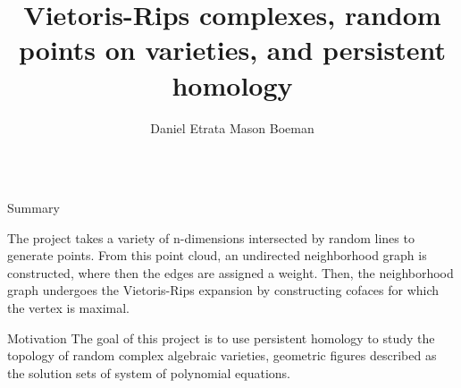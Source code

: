 \documentclass{beamer}
\title{Vietoris-Rips complexes, random points on varieties, and persistent homology}
\author{Daniel Etrata \quad Mason Boeman}
\institute{Mentors: Benjamin Antieau and J\={a}nis Lazovskis}
\begin{document}
\begin{frame}{}
\begin{columns}[t]

\begin{column}{0.32\linewidth}

\begin{block}{Summary}

The project takes a variety of n-dimensions intersected by random lines to generate points. From this point cloud, an undirected neighborhood graph is constructed, where then the edges are assigned a weight. Then, the neighborhood graph undergoes the Vietoris-Rips expansion by constructing cofaces for which the vertex is maximal.
\end{block}



\begin{block}{Motivation}
The goal of this project is to use persistent homology to study the topology of random complex algebraic varieties, geometric figures described as the solution sets of system of polynomial equations. 

\end{block}


\end{column}
\end{columns}
\end{frame}
\end{document}
